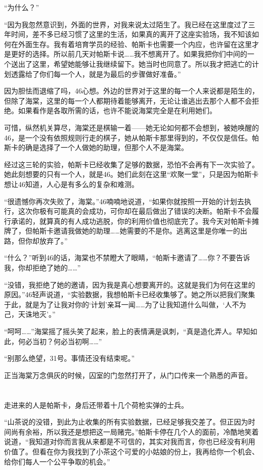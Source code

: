 “为什么？”

“因为我忽然意识到，外面的世界，对我来说太过陌生了。我已经在这里度过了三年时间，差不多已经习惯了这里的生活，如果真的离开了这座实验场，我不知该如何在外面生存。我有着培育学员的经验、帕斯卡也需要一个内应，也许留在这里才是更好的选择。所以前几天对帕斯卡说……我不想离开了。如果我把你们中间的一个送出了这里，希望她能够让我继续留下。她当时也同意了。所以我才把逃亡的计划透露给了你们每一个人，就是为最后的步骤做好准备。”

因为胆怯而退缩了吗，46心想。外边的世界对于这里的每一个人来说都是陌生的，但除了海棠，这里的每一个人都期待着能够离开，无论让谁逃出去那个人都不会拒绝。如果看作是各取所需的话，也许不能说海棠完全是在利用她们。

可惜，纵然机关算尽，海棠还是棋输一着——她无论如何都不会想到，被她唤醒的46，是一个没有依照规则行走的棋子，她从帕斯卡那里得到的，不仅仅是信任。帕斯卡的确是选择了一个人做她的助理，但那个人不是海棠。

经过这三轮的实验，帕斯卡已经收集了足够的数据，恐怕不会再有下一次实验了。她此刻想要的只有一个人，就是46。她们此刻在这里“欢聚一堂”，只是因为帕斯卡想让46知道，人心是有多么的复杂和难测。

“很遗憾你再次失败了，海棠。”46喃喃地说道，“如果你就按照一开始的计划去执行，这次你极有可能真的会成功，可你却在最后做出了错误的决断。帕斯卡不会履行承诺的，就算真的有人成功逃脱，你的利用价值也彻底完了。我今天对帕斯卡摊牌了，但帕斯卡邀请我做她的助理……她需要的不是你。逃离这里是你唯一的出路，但你却放弃了。”

“什么？”听到46的话，海棠也不禁瞪大了眼睛，“帕斯卡邀请了……你？不要告诉我，你却拒绝了她的……”

“没错，我拒绝了她的邀请，因为我是真心想要离开的。这就是我们为何在这里的原因。”46轻声说道，“实验数据，我想帕斯卡已经收集够了。她之所以把我们聚集于此，就是为了让我对你的‘计划’亲耳一闻……为了让我知道什么叫做，‘人不为己，天诛地灭’。”

“呵呵……”海棠摇了摇头笑了起来，脸上的表情满是讽刺，“真是造化弄人。早知如此，何必当初？何必当初啊……”

“别那么绝望，31号。事情还没有结束呢。”

正当海棠万念俱灰的时候，囚室的门忽然打开了，从门口传来一个熟悉的声音。

\section*{}

走进来的人是帕斯卡，身后还带着十几个荷枪实弹的士兵。

“山茶说的没错，到此为止收集的所有实验数据，已经足够我交差了。但正因为时间尚有余裕，所以我还是想把这一局赌完。”帕斯卡停在几个人的面前，冷酷地笑着说道，“我知道对你而言我从来都是不可信的，其实对我而言，你也已经没有利用价值了。但看在你为我找到了小茶这个可爱的小姑娘的份上，我再给你一个机会、给你们每人一个公平争取的机会。”

